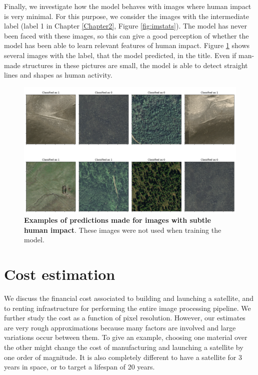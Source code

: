 Finally, we investigate how the model behaves with images where human impact is very minimal. For this purpose, we consider the images with the intermediate label (label 1 in Chapter \ref{Chapter2}, Figure \ref{fig:imstats}). The model has never been faced with these images, so this can give a good perception of whether the model has been able to learn relevant features of human impact. Figure \ref{fig:dataset03m_res03_l1} shows several images with the label, that the model predicted, in the title. Even if man-made structures in these pictures are small, the model is able to detect straight lines and shapes as human activity. 

\begin{figure}[H]
	\centering
	\captionsetup{width=1\linewidth}
	\includegraphics[width=1\textwidth]{Figures/results/class_dataset03m_res03_l1.png}
	\caption{\textbf{Examples of predictions made for images with subtle human impact}. These images were not used when training the model.}
	\label{fig:dataset03m_res03_l1}
\end{figure}

\section{Cost estimation}

We discuss the financial cost associated to building and launching a satellite, and to renting infrastructure for performing the entire image processing pipeline. We further study the cost as a function of pixel resolution. However, our estimates are very rough approximations because many factors are involved and large variations occur between them. To give an example, choosing one material over the other might change the cost of manufacturing and launching a satellite by one order of magnitude. It is also completely different to have a satellite for 3 years in space, or to target a lifespan of 20 years. 

